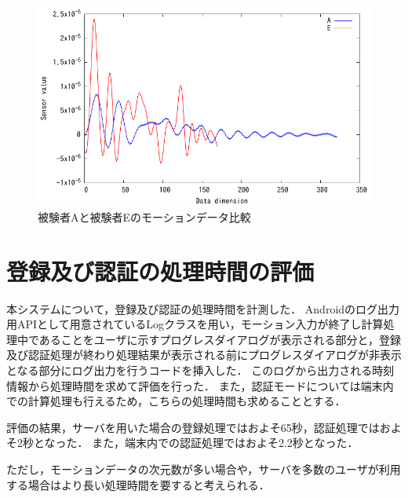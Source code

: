 \begin{figure}[hbtp]
  \centering
  \includegraphics[bb=0 0 360 216, width=12cm]{Graphs/comp.pdf}
  \caption{被験者Aと被験者Eのモーションデータ比較}
  \label{compare}
\end{figure}

\section{登録及び認証の処理時間の評価}
本システムについて，登録及び認証の処理時間を計測した．
Androidのログ出力用APIとして用意されているLogクラス\cite{5-log}を用い，モーション入力が終了し計算処理中であることをユーザに示すプログレスダイアログが表示される部分と，登録及び認証処理が終わり処理結果が表示される前にプログレスダイアログが非表示となる部分にログ出力を行うコードを挿入した．
このログから出力される時刻情報から処理時間を求めて評価を行った．
また，認証モードについては端末内での計算処理も行えるため，こちらの処理時間も求めることとする．

評価の結果，サーバを用いた場合の登録処理ではおよそ65秒，認証処理ではおよそ2秒となった．
また，端末内での認証処理ではおよそ2.2秒となった．

ただし，モーションデータの次元数が多い場合や，サーバを多数のユーザが利用する場合はより長い処理時間を要すると考えられる．
